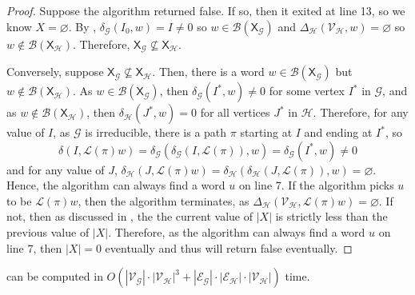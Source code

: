 \documentclass[hidelinks]{report}
\newcommand{\Lc}{\mathcal{L}}  %
\newcommand{\Gc}{\mathcal{G}}  %
\newcommand{\Hc}{\mathcal{H}}  %
\newcommand{\Vc}{\mathcal{V}}
\newcommand{\Ec}{\mathcal{E}}
\newcommand{\Bc}{\mathcal{B}}
\newcommand{\shift}[1]{\mathsf{X}_{#1}}
\theoremstyle{definition}
\begin{document}
\begin{proof}
    Suppose the algorithm returned false. If so, then it exited at line 13, so we 
    know \(X = \varnothing\). By , \(\delta_\Gc(I_0, w) = I \neq 0\) so 
    \(w \in \Bc(\shift{\Gc})\) and \(\Delta_\Hc(\Vc_\Hc, w) = \varnothing\) so \(w \notin \Bc(\shift{\Hc})\).
    Therefore, \(\shift{\Gc} \nsubseteq \shift{\Hc}\). 

    Conversely, suppose \(\shift{\Gc} \nsubseteq \shift{\Hc}\). Then, there 
    is a word \(w \in \Bc(\shift{\Gc})\)
    but \(w \notin \Bc(\shift{\Hc})\). As \(w \in \Bc(\shift{\Gc})\), then \(\delta_\Gc(I^*, w) \neq 0\)
    for some vertex \(I^*\) in \(\Gc\), and as \(w \notin \Bc(\shift{\Hc})\), then 
    \(\delta_\Hc(J^*, w) = 0\) for all vertices \(J^*\) in \(\Hc\). Therefore, for 
    any value of \(I\), as \(\Gc\) is irreducible, there is a path 
    \(\pi\) starting at \(I\) and ending at \(I^*\), so 
    \[\delta(I, \Lc(\pi)w) = \delta_\Gc(\delta_\Gc(I, \Lc(\pi)), w) = \delta_\Gc(I^*, w) \neq 0\]
    and for any value of \(J\), \(\delta_\Hc(J, \Lc(\pi)w) = \delta_\Hc(\delta_\Hc(J, \Lc(\pi)), w) = \varnothing\).
    Hence, the algorithm can always find a word \(u\) on line 7. If the algorithm picks \(u\) to be \(\Lc(\pi)w\), 
    then the algorithm terminates, as \(\Delta_\Hc(\Vc_\Hc, \Lc(\pi)w) = \varnothing\).
    If not, then as discussed in , the the current value of \(|X|\)
    is strictly less than the previous value of \(|X|\). Therefore, as the algorithm 
    can always find a word \(u\) on line 7, then \(|X| = 0\) eventually and 
    thus will return false eventually. 
\end{proof}

\begin{theorem}
     can be computed in \(O(|\Vc_\Gc|\cdot|\Vc_\Hc|^3 + |\Ec_\Gc|\cdot|\Ec_\Hc|\cdot|\Vc_\Hc|)\) time.
\end{theorem}
\end{document}
